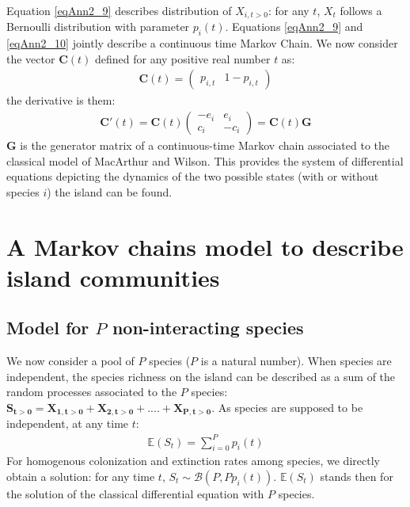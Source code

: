 Equation \eqref{eqAnn2_9} describes distribution of $X_{i,t>0}$: for any $t$, $X_t$ follows a Bernoulli distribution with parameter $p_i(t)$. Equations \eqref{eqAnn2_9} and \eqref{eqAnn2_10} jointly describe a continuous time Markov Chain. We now consider the vector $\mathbf{C}(t)$ defined for any positive real number $t$ as:
\begin{eqnarray}
\label{eqAnn2_11} \mathbf{C}(t)=\left(\begin{array}{cc}p_{i,t} & 1-p_{i,t} \end{array}\right)
\end{eqnarray}
the derivative is them:
\begin{eqnarray}
\label{eqAnn2_12} \mathbf{C}'(t)=\mathbf{C}(t)\left(\begin{array}{cc}-e_i & e_i \\c_i & -c_i\end{array}\right)= \mathbf{C}(t)\mathbf{G}
\end{eqnarray}
$\mathbf{G}$ is the generator matrix of a continuous-time Markov chain associated to the classical model of MacArthur and Wilson. This provides the system of differential equations depicting the dynamics of the two possible states (with or without species $i$) the island can be found.



\section{A Markov chains model to describe island communities}

\subsection{Model for $P$ non-interacting species}

We now consider a pool of $P$ species ($P$ is a natural number). When species are independent, the species richness on the island can be described as a sum of the random processes associated to the $P$ species: $\mathbf{S_{t>0}}=\mathbf{X_{1,t>0}} + \mathbf{X_{2,t>0}} + .... + \mathbf{X_{P,t>0}}$. As species are supposed to be independent, at any time $t$:
\begin{eqnarray}
\label{eqAnn2_2.1} \mathbb{E}(S_t)=\sum_{i=0}^Pp_i(t)
\end{eqnarray}
For homogenous colonization and extinction rates among species, we directly obtain a solution: for any time $t$, $S_t\sim \mathcal{B}(P,Pp_i(t))$. $\mathbb{E}(S_t)$ stands then for the solution of the classical differential equation with $P$ species.

